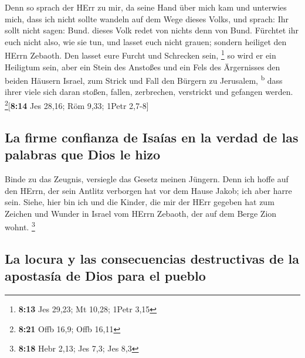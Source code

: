  Denn so sprach der HErr zu mir, da seine Hand über mich
kam und unterwies mich, dass ich nicht sollte wandeln auf dem Wege
dieses Volks, und sprach:  Ihr sollt nicht sagen: Bund.
dieses Volk redet von nichts denn von Bund. Fürchtet ihr euch nicht
also, wie sie tun, und lasset euch nicht grauen;  sondern
heiliget den HErrn Zebaoth. Den lasset eure Furcht und Schrecken sein,
\footnote{\textbf{8:13} Jes 29,23; Mt 10,28; 1Petr 3,15} 
so wird er ein Heiligtum sein, aber ein Stein des Anstoßes und ein Fels
des Ärgernisses den beiden Häusern Israel, zum Strick und Fall den
Bürgern zu Jerusalem, \textsuperscript{b}  dass ihrer
viele sich daran stoßen, fallen, zerbrechen, verstrickt und gefangen
werden. \footnote{\textbf{8:21} Offb 16,9; Offb 16,11}{[}\textbf{8:14}
Jes 28,16; Röm 9,33; 1Petr 2,7-8{]}

\hypertarget{la-firme-confianza-de-isauxedas-en-la-verdad-de-las-palabras-que-dios-le-hizo}{%
\subsection{La firme confianza de Isaías en la verdad de las palabras
que Dios le
hizo}\label{la-firme-confianza-de-isauxedas-en-la-verdad-de-las-palabras-que-dios-le-hizo}}

 Binde zu das Zeugnis, versiegle das Gesetz meinen
Jüngern.  Denn ich hoffe auf den HErrn, der sein Antlitz
verborgen hat vor dem Hause Jakob; ich aber harre sein. 
Siehe, hier bin ich und die Kinder, die mir der HErr gegeben hat zum
Zeichen und Wunder in Israel vom HErrn Zebaoth, der auf dem Berge Zion
wohnt. \footnote{\textbf{8:18} Hebr 2,13; Jes 7,3; Jes 8,3}

\hypertarget{la-locura-y-las-consecuencias-destructivas-de-la-apostasuxeda-de-dios-para-el-pueblo}{%
\subsection{La locura y las consecuencias destructivas de la apostasía
de Dios para el
pueblo}\label{la-locura-y-las-consecuencias-destructivas-de-la-apostasuxeda-de-dios-para-el-pueblo}}

